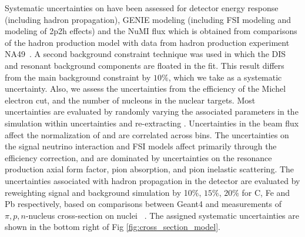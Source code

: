 
Systematic uncertainties on \xsecproton have been assessed for detector energy response (including hadron propagation), GENIE modeling (including FSI modeling and modeling of 2p2h effects) and the NuMI flux which is obtained from comparisons of the hadron production model with data from hadron production experiment NA49~\cite{Aliaga:2016oaz}.
A second background constraint technique was used in which the DIS and resonant background components are floated in the fit. This result differs from the main background constraint by $10\%$, which we take as a systematic uncertainty. Also, we assess the uncertainties from the efficiency of the Michel electron cut, and the number of nucleons in the nuclear targets.
  Most uncertainties are evaluated by randomly varying the associated parameters
in the simulation within uncertainties and re-extracting
\xsecproton. 
Uncertainties in the beam flux affect the normalization of \xsecproton
and are correlated across \QSqproton bins. The uncertainties on the
signal neutrino interaction and FSI models affect \xsecproton primarily through the efficiency
correction, and are dominated by uncertainties on the resonance
production axial form factor, pion absorption, and pion inelastic scattering. The uncertainties
associated with hadron propagation in the \minerva detector
are evaluated by reweighting signal and background simulation by 10$\%$, $15\%$, $20\%$ for C, Fe and Pb respectively, based on comparisons between Geant4 and measurements of $\pi,p,n$-nucleus cross-section on nuclei ~\cite{doi:10.1146/annurev.nucl.52.050102.090713,PhysRevC.23.2173,ALLARDYCE19731,PhysRevC.53.1745}. The assigned systematic uncertainties are shown in the bottom right of Fig \ref{fig:cross_section_model}.
